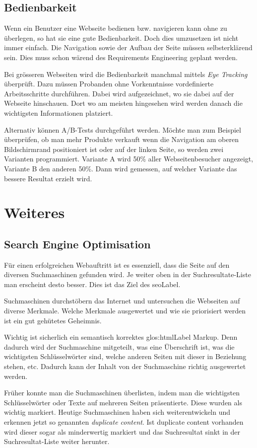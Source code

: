 \subsection{Bedienbarkeit}
Wenn ein Benutzer eine Webseite bedienen bzw. navigieren kann ohne zu überlegen, so hat sie eine gute Bedienbarkeit. Doch dies umzusetzen ist nicht immer einfach. Die Navigation sowie der Aufbau der Seite müssen selbsterklärend sein. Dies muss schon wärend des Requirements Engineering geplant werden.

Bei grösseren Webseiten wird die Bedienbarkeit manchmal mittels \textit{Eye Tracking} überprüft. Dazu müssen Probanden ohne Vorkenntnisse vordefinierte Arbeitsschritte durchführen. Dabei wird aufgezeichnet, wo sie dabei auf der Webseite hinschauen. Dort wo am meisten hingesehen wird werden danach die wichtigsten Informationen platziert.

Alternativ können A/B-Tests durchgeführt werden. Möchte man zum Beispiel überprüfen, ob man mehr Produkte verkauft wenn die Navigation am oberen Bildschirmrand positioniert ist oder auf der linken Seite, so werden zwei Varianten programmiert. Variante A wird 50\% aller Webseitenbesucher angezeigt, Variante B den anderen 50\%. Dann wird gemessen, auf welcher Variante das bessere Resultat erzielt wird.

\section{Weiteres}
\subsection{Search Engine Optimisation}
Für einen erfolgreichen Webauftritt ist es essenziell, dass die Seite auf den diversen Suchmaschinen gefunden wird. Je weiter oben in der Suchresultate-Liste man erscheint desto besser. Dies ist das Ziel des  \gls{seoLabel}.

Suchmaschinen durchstöbern das Internet und untersuchen die Webseiten auf diverse Merkmale. Welche Merkmale ausgewertet und wie sie priorisiert werden ist ein gut gehütetes Geheimnis.

Wichtig ist sicherlich ein semantisch korrektes \Gls{glos:htmlLabel} Markup. Denn dadurch wird der Suchmaschine mitgeteilt, was eine Überschrift ist, was die wichtigsten Schlüsselwörter sind, welche anderen Seiten mit dieser in Beziehung stehen, etc. Dadurch kann der Inhalt von der Suchmaschine richtig ausgewertet werden.

Früher konnte man die Suchmaschinen überlisten, indem man die wichtigsten Schlüsselwörter oder Texte auf mehreren Seiten präsentierte. Diese wurden  als wichtig markiert. Heutige Suchmaschinen haben sich weiterentwickeln und erkennen jetzt so genannten \textit{duplicate content}. Ist duplicate content vorhanden wird dieser sogar als minderwertig markiert und das Suchresultat sinkt in der Suchresultat-Liste weiter herunter.

